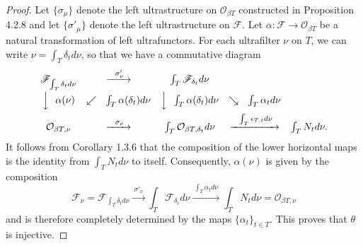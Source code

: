 \documentclass[11pt]{article}
\theoremstyle{plain}
\theoremstyle{definition}
\begin{document}
\begin{proof}
Let $\{\sigma_\mu\}$ denote the left ultrastructure on $\mathcal{O}_{\beta T}$ constructed in Proposition 4.2.8 and let $\{\sigma'_\mu\}$ denote the left ultrastructure on $\mathscr{F}$. Let $\alpha : \mathscr{F} \to \mathcal{O}_{\beta T}$ be a natural transformation of left ultrafunctors. For each ultrafilter $\nu$ on $T$, we can write $\nu = \int_T \delta_t d\nu$, so that we have a commutative diagram
\[
\begin{array}{ccccc}
\mathscr{F}_{\int_T \delta_t d\nu} & \xrightarrow{\ \ \sigma'_\nu\ } & \int_T \mathscr{F}_{\delta_t} d\nu & & \\[6pt]
\Big\downarrow{\ \ \alpha(\nu)} & \swarrow{\ \ \int_T \alpha(\delta_t) d\nu} & \Big\downarrow{\ \ \int_T \alpha(\delta_t) d\nu} & \searrow{\ \ \int_T \alpha_t d\nu} & \\[6pt]
\mathcal{O}_{\beta T, \nu} & \xrightarrow{\ \ \sigma_\nu\ } & \int_T \mathcal{O}_{\beta T, \delta_t} d\nu & \xrightarrow{\ \ \int_T \epsilon_{T,t} d\nu\ } & \int_T N_t d\nu. \\
\end{array}
\]
It follows from Corollary 1.3.6 that the composition of the lower horizontal maps is the identity from $\int_T N_t d\nu$ to itself.
Consequently, $\alpha(\nu)$ is given by the composition
\[
\mathscr{F}_\nu = \mathscr{F}_{\int_T \delta_t d\nu} \xrightarrow{\ \sigma'_\nu\ } \int_T \mathscr{F}_{\delta_t} d\nu \xrightarrow{\ \int_T \alpha_t d\nu\ } \int_T N_t d\nu = \mathcal{O}_{\beta T, \nu}
\]
and is therefore completely determined by the maps $\{\alpha_t\}_{t \in T}$. This proves that $\theta$ is injective.


\end{proof}
\end{document}
